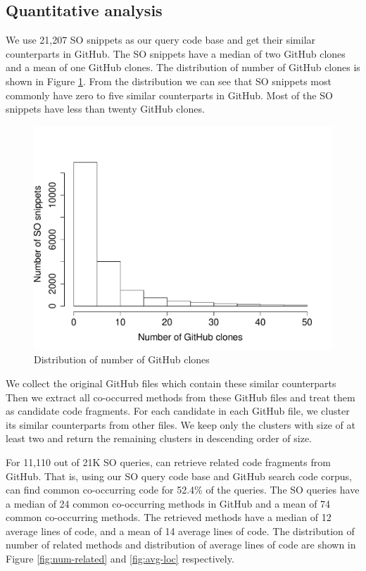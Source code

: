 \subsection{Quantitative analysis}
We use 21,207 SO snippets as our query code base and get their similar counterparts in GitHub. 
The SO snippets have a median of two GitHub clones and a mean of one GitHub clones. The distribution of number of GitHub clones is shown in Figure \ref{fig:num-clone}. From the distribution we can see that SO snippets most commonly have zero to five similar counterparts in GitHub. Most of the SO snippets have less than twenty GitHub clones.

\begin{figure}
	\includegraphics[scale=0.4]{figures/dist-gh-clone.pdf}
	\caption{Distribution of number of GitHub clones}
	\label{fig:num-clone}
\end{figure}

We collect the original GitHub files which contain these similar counterparts Then we extract all co-occurred methods from these GitHub files and treat them as candidate code fragments. For each candidate in each GitHub file, we cluster its similar counterparts from other files. We keep only the clusters with size of at least two and return the remaining clusters in descending order of size.

For 11,110 out of 21K SO queries, {\tool} can retrieve related code fragments from GitHub. That is, using our SO query code base and GitHub search code corpus, {\tool} can find common co-occurring code for 52.4\% of the queries. The SO queries have a median of 24 common co-occurring methods in GitHub and a mean of 74 common co-occurring methods. The retrieved methods have a median of 12 average lines of code, and a mean of 14 average lines of code. The distribution of number of related methods and distribution of average lines of code are shown in Figure \ref{fig:num-related} and \ref{fig:avg-loc} respectively.

